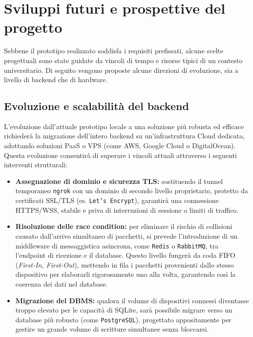 \documentclass[12pt,a4paper]{article}
\begin{document}
\section{Sviluppi futuri e prospettive del progetto}
Sebbene il prototipo realizzato soddisfa i requisiti prefissati, alcune scelte progettuali 
sono state guidate da vincoli di tempo e risorse tipici di un contesto universitario. 
Di seguito vengono proposte alcune direzioni di evoluzione, sia a livello di backend che di hardware.

\subsection{Evoluzione e scalabilità del backend}
L'evoluzione dall'attuale prototipo locale a una soluzione più robusta ed efficace richiederà 
la migrazione dell’intero backend su un’infrastruttura Cloud dedicata, 
adottando soluzioni PaaS o VPS (come AWS, Google Cloud o DigitalOcean). 
Questa evoluzione consentirà di superare i vincoli attuali attraverso i seguenti interventi strutturali:
\begin{itemize}
    \item \textbf{Assegnazione di dominio e sicurezza TLS:} sostituendo il tunnel temporaneo \texttt{ngrok} con un dominio di secondo livello proprietario, protetto da certificati SSL/TLS (es. \texttt{Let's Encrypt}), garantirà una connessione HTTPS/WSS, stabile e priva di interruzioni di sessione o limiti di traffico.
    \item \textbf{Risoluzione delle race condition:} per eliminare il rischio di collisioni causato dall'arrivo simultaneo di pacchetti, si prevede l'introduzione di un middleware di messaggistica asincrona, come \texttt{Redis} o \texttt{RabbitMQ}, tra l'endpoint di ricezione e il database. Questo livello fungerà da coda FIFO (\textit{First-In, First-Out}), mettendo in fila i pacchetti provenienti dallo stesso dispositivo per elaborarli rigorosamente uno alla volta, garantendo così la coerenza dei dati nel database.
    \item \textbf{Migrazione del DBMS:} qualora il volume di dispositivi connessi diventasse troppo elevato per le capacità di SQLite, sarà possibile migrare verso un database più robusto (come \texttt{PostgreSQL}), progettato appositamente per gestire un grande volume di scritture simultanee senza bloccarsi.
\end{itemize}
\end{document}
